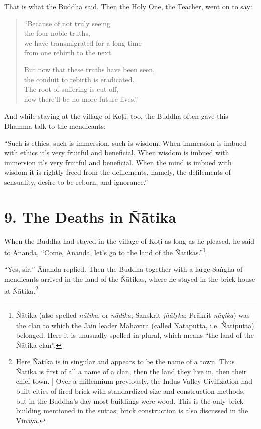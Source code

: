 \documentclass[12pt,openany]{book}%
\begin{document}
That is what the Buddha said. Then the Holy One, the Teacher, went on to say: 

\begin{verse}%
“Because of not truly seeing \\
the four noble truths, \\
we have transmigrated for a long time \\
from one rebirth to the next. 

But now that these truths have been seen, \\
the conduit to rebirth is eradicated. \\
The root of suffering is cut off, \\
now there’ll be no more future lives.” 

%
\end{verse}

And while staying at the village of \textsanskrit{Koṭi}, too, the Buddha often gave this Dhamma talk to the mendicants: 

“Such is ethics, such is immersion, such is wisdom. When immersion is imbued with ethics it’s very fruitful and beneficial. When wisdom is imbued with immersion it’s very fruitful and beneficial. When the mind is imbued with wisdom it is rightly freed from the defilements, namely, the defilements of sensuality, desire to be reborn, and ignorance.” 

\section*{9. The Deaths in \textsanskrit{Ñātika} }

When the Buddha had stayed in the village of \textsanskrit{Koṭi} as long as he pleased, he said to Ānanda, “Come, Ānanda, let’s go to the land of the \textsanskrit{Ñātikas}.”\footnote{\textsanskrit{Ñātika} (also spelled \textit{\textsanskrit{nātika}}, or \textit{\textsanskrit{nādika}}; Sanskrit \textit{\textsanskrit{jñātṛka}}; \textsanskrit{Prākrit} \textit{\textsanskrit{nāyika}}) was the clan to which the Jain leader \textsanskrit{Mahāvīra} (called \textsanskrit{Nāṭaputta}, i.e. \textsanskrit{Ñātiputta}) belonged. Here it is unusually spelled in plural, which means “the land of the \textsanskrit{Ñātika} clan”. } 

“Yes, sir,” Ānanda replied. Then the Buddha together with a large \textsanskrit{Saṅgha} of mendicants arrived in the land of the \textsanskrit{Ñātikas}, where he stayed in the brick house at \textsanskrit{Ñātika}.\footnote{Here \textsanskrit{Ñātika} is in singular and appears to be the name of a town. Thus \textsanskrit{Ñātika} is first of all a name of a clan, then the land they live in, then their chief town. | Over a millennium previously, the Indus Valley Civilization had built cities of fired brick with standardized size and construction methods, but in the Buddha’s day most buildings were wood. This is the only brick building mentioned in the suttas; brick construction is also discussed in the Vinaya. } 
\end{document}
